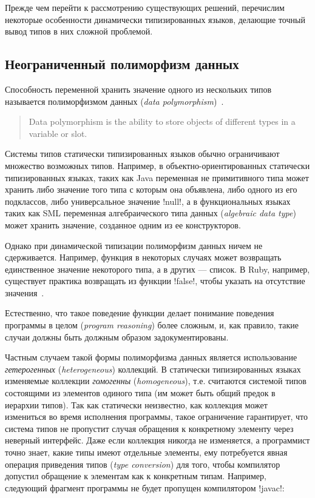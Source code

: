 Прежде чем перейти к рассмотрению существующих решений, перечислим некоторые
особенности динамически типизированных языков, делающие точный вывод типов в них
сложной проблемой.

\subsection{Неограниченный полиморфизм данных}

Способность переменной хранить значение одного из нескольких типов называется
полиморфизмом данных (\emph{data polymorphism})~\cite{Agesen1995}. 

\begin{quote}
  Data polymorphism is the ability to store objects of different types in a
  variable or slot. 
\end{quote}

Системы типов статически типизированных языков обычно ограничивают множество
возможных типов.  Например, в объектно-ориентированных статически типизированных
языках, таких как Java переменная не примитивного типа может хранить либо
значение того типа с которым она объявлена, либо одного из его подклассов, либо
универсальное значение !null!, а в функциональных языках таких как SML
переменная алгебраического типа данных (\emph{algebraic data type}) может
хранить значение, созданное одним из ее конструкторов.

Однако при динамической типизации полиморфизм данных ничем не
сдерживается. Например, функция в некоторых случаях может возвращать
единственное значение некоторого типа, а в других --- список. В Ruby,
например, существует практика возвращать из функции !false!, чтобы указать на
отсутствие значения~\cite{Ren2013}. 

Естественно, что такое поведение функции делает понимание поведения программы в
целом (\emph{program reasoning}) более сложным, и, как правило, такие случаи
должны быть должным образом задокументированы. 

Частным случаем такой формы полиморфизма данных является использование
\emph{гетерогенных} (\emph{heterogeneous}) коллекций. В статически
типизированных языках изменяемые коллекции \emph{гомогенны}
(\emph{homogeneous}), т.е. считаются системой типов состоящими из элементов
одиного типа (им может быть общий предок в иерархии типов).  Так как статически
неизвестно, как коллекция может измениться во время исполнения программы,
такое ограничение гарантирует, что система типов не пропустит случая обращения к
конкретному элементу через неверный интерфейс. Даже если коллекция никогда не
изменяется, а программист точно знает, какие типы имеют отдельные элементы, ему
потребуется явная операция приведения типов (\emph{type conversion}) для того, чтобы
компилятор допустил обращение к элементам как к конкретным типам. Например,
следующий фрагмент программы не будет пропущен компилятором !javac!:

